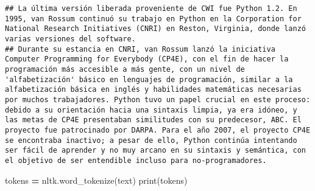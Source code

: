 \documentclass[
]{article}
\newenvironment{Shaded}{\begin{snugshade}}{\end{snugshade}}
\newcommand{\BuiltInTok}[1]{#1}
\newcommand{\NormalTok}[1]{#1}
\newcommand{\OperatorTok}[1]{\textcolor[rgb]{0.81,0.36,0.00}{\textbf{#1}}}
\begin{document}
\begin{verbatim}
## La última versión liberada proveniente de CWI fue Python 1.2. En 1995, van Rossum continuó su trabajo en Python en la Corporation for National Research Initiatives (CNRI) en Reston, Virginia, donde lanzó varias versiones del software.
## Durante su estancia en CNRI, van Rossum lanzó la iniciativa Computer Programming for Everybody (CP4E), con el fin de hacer la programación más accesible a más gente, con un nivel de 'alfabetización' básico en lenguajes de programación, similar a la alfabetización básica en inglés y habilidades matemáticas necesarias por muchos trabajadores. Python tuvo un papel crucial en este proceso: debido a su orientación hacia una sintaxis limpia, ya era idóneo, y las metas de CP4E presentaban similitudes con su predecesor, ABC. El proyecto fue patrocinado por DARPA.​ Para el año 2007, el proyecto CP4E se encontraba inactivo;​ a pesar de ello, Python continúa intentando ser fácil de aprender y no muy arcano en su sintaxis y semántica, con el objetivo de ser entendible incluso para no-programadores.
\end{verbatim}

\begin{Shaded}
\begin{Highlighting}[]
\NormalTok{tokens }\OperatorTok{=}\NormalTok{ nltk.word\_tokenize(text)}
\BuiltInTok{print}\NormalTok{(tokens)}
\end{Highlighting}
\end{Shaded}
\end{document}
